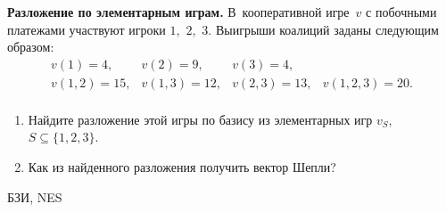 \begin{problem}
 {\bf Разложение по элементарным играм.}
В~кооперативной игре~$v$ с побочными платежами участвуют
игроки $1$,~$2$,~$3$. Выигрыши коалиций заданы следующим
образом:
\[\begin{array}{llll}
  v(1)=4,&v(2)=9,&v(3)=4,\\
  v(1,2)=15,&v(1,3)=12,&v(2,3)=13,&v(1,2,3)=20.\\
\end{array}\]
\begin{enumerate}
  \item Найдите разложение этой игры по базису из элементарных игр
  $v_S$, $S\subseteq\{1,2,3\}$.
  \item Как из найденного разложения получить вектор Шепли?
\end{enumerate}




\begin{source}
БЗИ, NES
\end{source}


\begin{sol}

\end{sol}
\end{problem}



